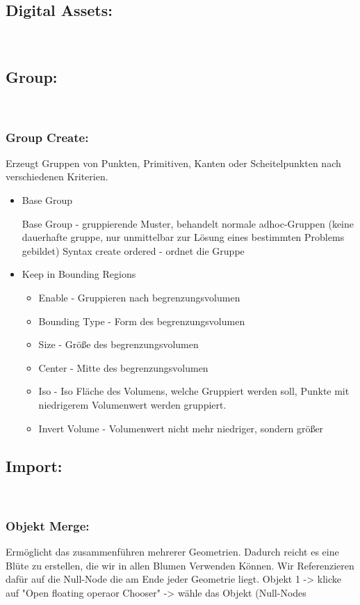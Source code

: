 \subsection*{​Digital Assets:}​
\subsection*{​Group:}​
\subsubsection*{​Group Create:}
Erzeugt Gruppen von Punkten, Primitiven, Kanten oder Scheitelpunkten nach verschiedenen Kriterien.
\begin{itemize}
\item Base Group	\begin{itemize}
		Base Group	- gruppierende Muster, behandelt normale adhoc-Gruppen (keine dauerhafte gruppe, nur unmittelbar zur Lösung eines bestimmten Problems gebildet) Syntax
		create ordered - ordnet die Gruppe
		\end{itemize}
\item Keep in Bounding Regions 
		\begin{itemize}
		\item Enable	- Gruppieren nach begrenzungsvolumen
		\item Bounding Type - Form des begrenzungsvolumen
		\item Size - Größe des begrenzungsvolumen
		\item Center - Mitte des begrenzungsvolumen
		\item Iso - Iso Fläche des Volumens, welche Gruppiert werden soll, Punkte mit niedrigerem Volumenwert werden gruppiert. 
		\item Invert Volume - Volumenwert nicht mehr niedriger, sondern größer
		\end{itemize}
\end{itemize}

\subsection*{​Import:}​
\subsubsection*{​Objekt Merge:}
Ermöglicht das zusammenführen mehrerer Geometrien. Dadurch reicht es eine Blüte zu erstellen, die wir in allen Blumen Verwenden Können. Wir Referenzieren dafür auf die Null-Node die am Ende jeder Geometrie liegt. 
Objekt 1 -> klicke auf "Open floating operaor Chooser" -> wähle das Objekt (Null-Nodes

